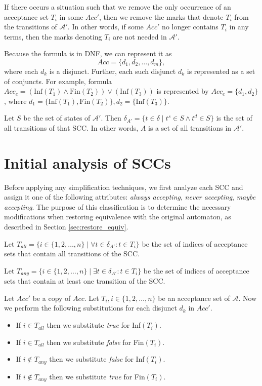\documentclass[
  digital, %
  twoside, %
  table,   %
  lof,     %
  lot,     %
]{fithesis3}
\begin{document}
If there occurs a situation such that we remove the only occurrence of an acceptance set $T_i$ in some $Acc'$, then we remove the marks that denote $T_i$ from the transitions of $\mathcal{A'}$. In other words, if some $Acc'$ no longer contains $T_i$ in any terms, then the marks denoting $T_i$ are not needed in $\mathcal{A'}$.

Because the formula is in DNF, we can represent it as 
\begin{equation*}
  Acc = \{d_1, d_2, \dots, d_m\},
\end{equation*}
where each $d_k$ is a disjunct. Further, each such disjunct $d_k$ is represented as a set of conjuncts. For example, formula $Acc_e = (\text{Inf}(T_1) \wedge \text{Fin}(T_2)) \vee (\text{Inf}(T_3))$ is represented by $Acc_e = \{d_1, d_2\}$, where $d_1 = \{\text{Inf}(T_1), \text{Fin}(T_2)\}, d_2 = \{\text{Inf}(T_3)\}$. 

Let $S$ be the set of states of $\mathcal{A'}$. Then $\delta_{A'} = \{t \in \delta \mid t^s \in S \wedge t^d \in S\}$ is the set of all transitions of that SCC. In other words, $A$ is a set of all transitions in $\mathcal{A'}$.

\section{Initial analysis of SCCs}
\label{sec:init_analysis}
Before applying any simplification techniques, we first analyze each SCC and assign it one of the following attributes: \emph{always accepting}, \emph{never accepting}, \emph{maybe accepting}. The purpose of this classification is to determine the necessary modifications when restoring equivalence with the original automaton, as described in Section \ref{sec:restore_equiv}. 

Let $T_{all} = \{i \in \{1, 2, \dots, n\} \mid \forall t \in \delta_{A'} \colon t \in T_i \}$ be the set of indices of acceptance sets that contain all transitions of the SCC.

Let $T_{any} = \{i \in \{1, 2, \dots, n\} \mid \exists t \in \delta_{A'} \colon t \in T_i \}$ be the set of indices of acceptance sets that contain at least one transition of the SCC.

Let $Acc'$ be a copy of $Acc$. Let $T_i, i \in \{1, 2, \dots, n\}$ be an acceptance set of $\mathcal{A}$. Now we perform the following substitutions for each disjunct $d_k$ in $Acc'$. 
\begin{itemize}
  \item If $i \in T_{all}$ then we substitute \emph{true} for Inf$(T_i)$.
  \item If $i \in T_{all}$ then we substitute \emph{false} for Fin$(T_i)$.
  \item If $i \notin T_{any}$ then we substitute \emph{false} for Inf$(T_i)$.
  \item If $i \notin T_{any}$ then we substitute \emph{true} for Fin$(T_i)$.
\end{itemize}
\end{document}
